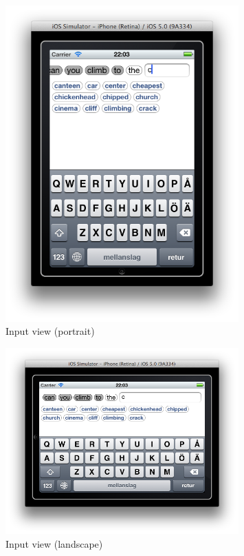 \begin{figure}[htb]
\centering
\includegraphics[width=0.8\textwidth]{fig/inputview_portrait}
\caption{Input view (portrait)}
\label{fig:inputview_portrait}
\end{figure}

\begin{figure}[htb]
\centering
\includegraphics[width=0.8\textwidth]{fig/inputview_landscape}
\caption{Input view (landscape)}
\label{fig:inputview_landscape}
\end{figure}

